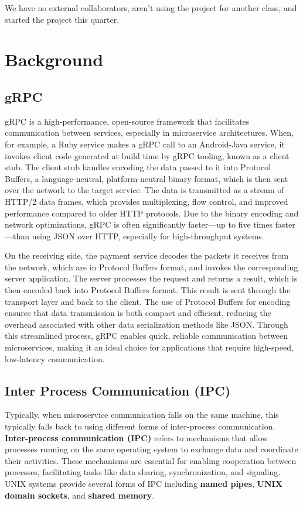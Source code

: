 \documentclass[letterpaper,twocolumn,10pt]{article}
\begin{document}
We have no external collaborators, aren't using the project for another class, and started the project this quarter.

\section{Background}

\subsection{gRPC}
gRPC is a high-performance, open-source framework that facilitates communication between services, especially in microservice architectures.
When, for example, a Ruby service makes a gRPC call to an Android-Java service, it invokes client code generated at build time by gRPC tooling, known as a client stub.
The client stub handles encoding the data passed to it into Protocol Buffers, a language-neutral, platform-neutral binary format, which is then sent over the network to the target service.
The data is transmitted as a stream of HTTP/2 data frames, which provides multiplexing, flow control, and improved performance compared to older HTTP protocols.
Due to the binary encoding and network optimizations, gRPC is often significantly faster—up to five times faster—than using JSON over HTTP, especially for high-throughput systems.

On the receiving side, the payment service decodes the packets it receives from the network, which are in Protocol Buffers format, and invokes the corresponding server application.
The server processes the request and returns a result, which is then encoded back into Protocol Buffers format.
This result is sent through the transport layer and back to the client.
The use of Protocol Buffers for encoding ensures that data transmission is both compact and efficient, reducing the overhead associated with other data serialization methods like JSON.
Through this streamlined process, gRPC enables quick, reliable communication between microservices, making it an ideal choice for applications that require high-speed, low-latency communication.

\subsection{Inter Process Communication (IPC)}
Typically, when microservice communication falls on the same machine, this typically falls back to using different forms of inter-process communication.
\textbf{Inter-process communication (IPC)} refers to mechanisms that allow processes running on the same operating system to exchange data and coordinate their activities.
These mechanisms are essential for enabling cooperation between processes, facilitating tasks like data sharing, synchronization, and signaling.
UNIX systems provide several forms of IPC including \textbf{named pipes}, \textbf{UNIX domain sockets}, and \textbf{shared memory}.
\end{document}
